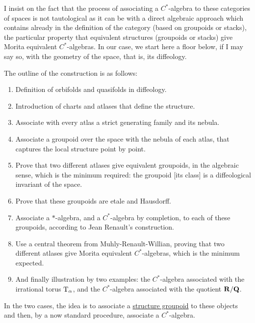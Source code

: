 I insist on the fact that the process of associating a $C^*$-algebra to these categories of spaces is not tautological
as it can be with a direct algebraic approach which contains already in the definition of the category
(based on groupoids or stacks),
the particular property that equivalent structures (groupoids or stacks) give Morita equivalent $C^*$-algebras.
In our case,
we start here a floor below,
if I may say so,
with the geometry of the space,
that is,
its diffeology.

The outline of the construction is as follows:
\begin{enumerate}
  \item Definition of orbifolds and quasifolds in diffeology.
  \item Introduction of charts and atlases that define the structure.
  \item Associate with every atlas a strict generating family and its nebula.
  \item Associate a groupoid over the space with the nebula of each atlas,
  that captures the local structure point by point.
  \item Prove that two different atlases give equivalent groupoids,
  in the algebraic sense,
  which is the minimum required:
  the groupoid [its class] is a diffeological invariant of the space.
  \item Prove that these groupoids are etale and Hausdorff.
  \item Associate a $*$-algebra,
  and a $C^*$-algebra by completion,
  to each of these groupoids,
  according to Jean Renault's construction.
  \item Use a central theorem from Muhly-Renault-Willian,
  proving that two different atlases give Morita equivalent $C^*$-algebras,
  which is the minimum expected.
  \item And finally illustration by two examples:
  the $C^*$-algebra associated with the irrational torus $\mathrm{T}_\alpha$,
  and the $C^*$-algebra associated with the quotient $\mathbf{R}/\mathbf{Q}$.
\end{enumerate}

In the two cases,
the idea is to associate a \uline{structure groupoid} to these objects and then,
by a now standard procedure,
associate a $C^*$-algebra.

\begin{center}
\end{center}

